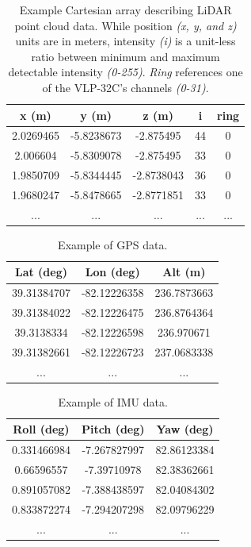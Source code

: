 \documentclass[numbered,pdftex]{ohio-etd}
\begin{document}
{{		\begin{table}[H]
			\centering
			\begin{tabular}{|c|c|c|c|c|}
				\hline
				x (m)     & y (m)      & z (m)      & i   & ring \\
				\hline
				2.0269465 & -5.8238673 & -2.875495  & 44  & 0    \\
				\hline
				2.006604  & -5.8309078 & -2.875495  & 33  & 0    \\
				\hline
				1.9850709 & -5.8344445 & -2.8738043 & 36  & 0    \\
				\hline
				1.9680247 & -5.8478665 & -2.8771851 & 33  & 0    \\
				\hline
				...       & ...        & ...        & ... & ...  \\
				\hline
			\end{tabular}
			\caption[Example LiDAR Data]{Example Cartesian array describing LiDAR point cloud data. While position \textit{(x, y, and z)} units are in meters, intensity \textit{(i)} is a unit-less ratio between minimum and maximum detectable intensity \textit{(0-255)}. \textit{Ring} references one of the VLP-32C's channels \textit{(0-31)}.}
			\label{tab:example_lidar_data}
		\end{table}
		
		\begin{table}[H]
			\centering
			\begin{tabular}{|c|c|c|}
				\hline
				Lat (deg)   & Lon (deg)    & Alt (m)     \\
				\hline
				39.31384707 & -82.12226358 & 236.7873663 \\
				\hline
				39.31384022 & -82.12226475 & 236.8764364 \\
				\hline
				39.3138334  & -82.12226598 & 236.970671  \\
				\hline
				39.31382661 & -82.12226723 & 237.0683338 \\
				\hline
				...         & ...          & ...       \\ 
				\hline
			\end{tabular}
			\caption[Example GPS Data]{Example of GPS data. }
			\label{tab:example_gps_data}
		\end{table}	
	
		
		\begin{table}[H]
		\centering
		\begin{tabular}{|c|c|c|}
			\hline
			Roll (deg)  & Pitch (deg)  & Yaw (deg)   \\
			\hline
			0.331466984 & -7.267827997 & 82.86123384 \\
			\hline
			0.66596557  & -7.39710978  & 82.38362661 \\
			\hline
			0.891057082 & -7.388438597 & 82.04084302 \\
			\hline
			0.833872274 & -7.294207298 & 82.09796229 \\
			\hline
			...         & ...          & ...        \\
			\hline
		\end{tabular}
		\caption[Example IMU Data]{Example of IMU data.}
		\label{tab:example_imu_data}
		\end{table}
		
}}
\end{document}
